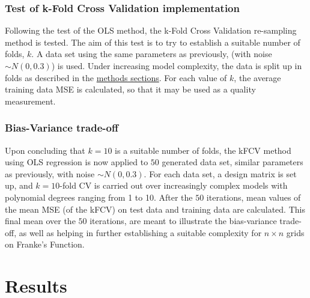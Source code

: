 \documentclass[%
oneside,                 %
final,                   %
10pt]{article}
\begin{document}
\subsubsection{Test of k-Fold Cross Validation implementation}
Following the test of the OLS method, the k-Fold Cross Validation re-sampling method is tested. The aim of this test is to try to establish a suitable number of folds, $k$. A data set using the same parameters as previously, (with noise $\sim N(0,0.3)$) is used. Under increasing model complexity, the data is split up in folds as described in the \hyperref[M:kfold]{methods sections}. For each value of $k$, the average training data MSE is calculated, so that it may be used as a quality measurement. 

\subsubsection{Bias-Variance trade-off}
Upon concluding that $k=10$ is a suitable number of folds, the kFCV method using OLS regression is now applied to $50$ generated data set, similar parameters as previously, with noise $\sim N(0,0.3)$. For each data set, a design matrix is set up, and $k=10$-fold CV is carried out over increasingly complex models with polynomial degrees ranging from 1 to 10. After the $50$ iterations, mean values of the mean MSE (of the kFCV) on test data and training data are calculated. This final mean over the $50$ iterations, are meant to illustrate the bias-variance trade-off, as well as helping in further establishing a suitable complexity for $n \times n$ grids on Franke's Function.
\section{Results}
\end{document}
